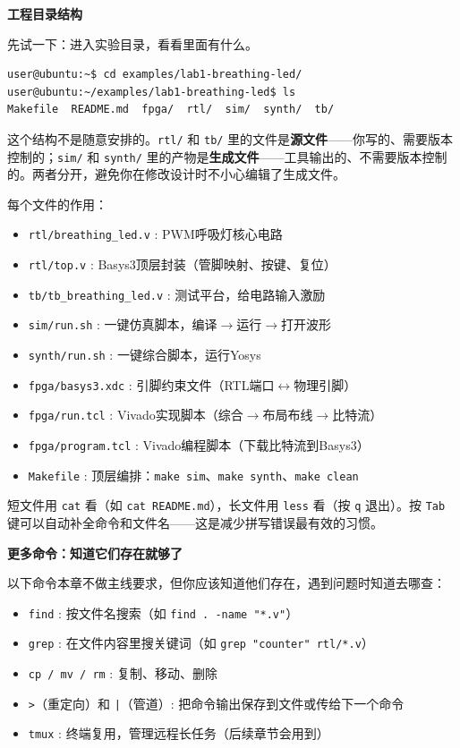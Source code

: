 \documentclass[11pt,a4paper]{article}
\begin{document}
\textbf{工程目录结构}

先试一下：进入实验目录，看看里面有什么。

\begin{lstlisting}[style=shell]
user@ubuntu:~$ cd examples/lab1-breathing-led/
user@ubuntu:~/examples/lab1-breathing-led$ ls
Makefile  README.md  fpga/  rtl/  sim/  synth/  tb/
\end{lstlisting}

这个结构不是随意安排的。\texttt{rtl/} 和 \texttt{tb/} 里的文件是\textbf{源文件}——你写的、需要版本控制的；\texttt{sim/} 和 \texttt{synth/} 里的产物是\textbf{生成文件}——工具输出的、不需要版本控制的。两者分开，避免你在修改设计时不小心编辑了生成文件。

每个文件的作用：
\begin{itemize}
  \item \texttt{rtl/breathing\_led.v} : PWM呼吸灯核心电路
  \item \texttt{rtl/top.v} : Basys3顶层封装（管脚映射、按键、复位）
  \item \texttt{tb/tb\_breathing\_led.v} : 测试平台，给电路输入激励
  \item \texttt{sim/run.sh} : 一键仿真脚本，编译$\rightarrow$运行$\rightarrow$打开波形
  \item \texttt{synth/run.sh} : 一键综合脚本，运行Yosys
  \item \texttt{fpga/basys3.xdc} : 引脚约束文件（RTL端口$\leftrightarrow$物理引脚）
  \item \texttt{fpga/run.tcl} : Vivado实现脚本（综合$\rightarrow$布局布线$\rightarrow$比特流）
  \item \texttt{fpga/program.tcl} : Vivado编程脚本（下载比特流到Basys3）
  \item \texttt{Makefile} : 顶层编排：\texttt{make sim}、\texttt{make synth}、\texttt{make clean}
\end{itemize}

\begin{tipbox}
短文件用 \texttt{cat} 看（如 \texttt{cat README.md}），长文件用 \texttt{less} 看（按 \texttt{q} 退出）。按 \texttt{Tab} 键可以自动补全命令和文件名——这是减少拼写错误最有效的习惯。
\end{tipbox}

\textbf{更多命令：知道它们存在就够了}

以下命令本章不做主线要求，但你应该知道他们存在，遇到问题时知道去哪查：

\begin{itemize}
  \item \texttt{find} : 按文件名搜索（如 \texttt{find . -name "*.v"}）
  \item \texttt{grep} : 在文件内容里搜关键词（如 \texttt{grep "counter" rtl/*.v}）
  \item \texttt{cp / mv / rm} : 复制、移动、删除
  \item \texttt{\textgreater{}}（重定向）和 \texttt{|}（管道）: 把命令输出保存到文件或传给下一个命令
  \item \texttt{tmux} : 终端复用，管理远程长任务（后续章节会用到）
\end{itemize}
\end{document}
